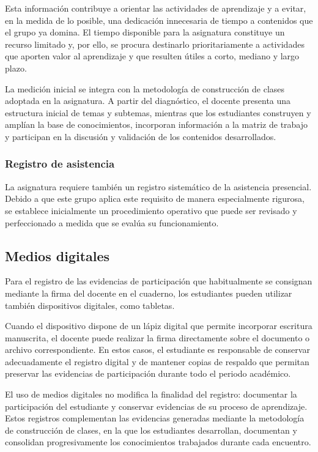 \documentclass[10pt]{article}
\begin{document}
Esta información contribuye a orientar las actividades de aprendizaje y a evitar, en la medida de lo posible, una dedicación innecesaria de tiempo a contenidos que el grupo ya domina. El tiempo disponible para la asignatura constituye un recurso limitado y, por ello, se procura destinarlo prioritariamente a actividades que aporten valor al aprendizaje y que resulten útiles a corto, mediano y largo plazo.

La medición inicial se integra con la metodología de construcción de clases adoptada en la asignatura. A partir del diagnóstico, el docente presenta una estructura inicial de temas y subtemas, mientras que los estudiantes construyen y amplían la base de conocimientos, incorporan información a la matriz de trabajo y participan en la discusión y validación de los contenidos desarrollados.

\subsubsection{Registro de asistencia}

La asignatura requiere también un registro sistemático de la asistencia presencial. Debido a que este grupo aplica este requisito de manera especialmente rigurosa, se establece inicialmente un procedimiento operativo que puede ser revisado y perfeccionado a medida que se evalúa su funcionamiento.

\subsection{Medios digitales}

Para el registro de las evidencias de participación que habitualmente se consignan mediante la firma del docente en el cuaderno, los estudiantes pueden utilizar también dispositivos digitales, como tabletas.

Cuando el dispositivo dispone de un lápiz digital que permite incorporar escritura manuscrita, el docente puede realizar la firma directamente sobre el documento o archivo correspondiente. En estos casos, el estudiante es responsable de conservar adecuadamente el registro digital y de mantener copias de respaldo que permitan preservar las evidencias de participación durante todo el periodo académico.

El uso de medios digitales no modifica la finalidad del registro: documentar la participación del estudiante y conservar evidencias de su proceso de aprendizaje. Estos registros complementan las evidencias generadas mediante la metodología de construcción de clases, en la que los estudiantes desarrollan, documentan y consolidan progresivamente los conocimientos trabajados durante cada encuentro.
\end{document}
